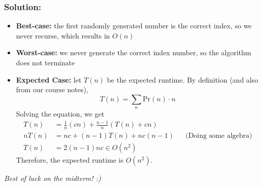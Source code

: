 \documentclass{report}
\begin{document}
\subsubsection{Solution:}
\begin{itemize}
\item \textbf{Best-case:} the first randomly generated number is the correct index, so we never recurse, which results in $O(n)$
\item \textbf{Worst-case:} we never generate the correct index number, so the algorithm does not terminate
\item \textbf{Expected Case:} let $T(n)$ be the expected runtime. By definition (and also from our course notes),$$T(n) = \sum_n \mathrm{Pr}(n) \cdot n$$
Solving the equation, we get
\begin{align*}
T(n) &= \frac{1}{n}(cn) + \frac{n-1}{n}\left(T(n) + cn\right) \\
nT(n) &= nc + (n-1)T(n) + nc(n-1) && \text{(Doing some algebra)} \\
T(n) &= 2(n-1)nc \in O(n^2)
\end{align*}
Therefore, the expected runtime is $O(n^2)$.
\end{itemize}
\begin{center}
\textit{Best of luck on the midterm! :)}
\end{center}
\end{document}
